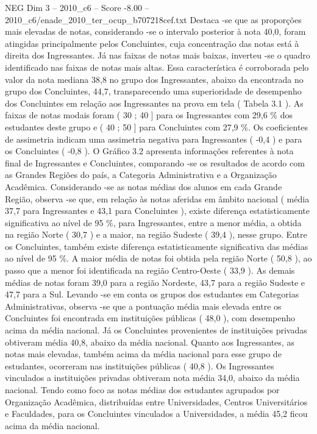 \begin{textsample}{NEG Dim 3 – 2010\_c6 – Score -8.00 – 2010\_c6/enade\_2010\_ter\_ocup\_b707218cef.txt}
Destaca -se que as proporções mais elevadas de notas, considerando -se o intervalo posterior à nota 40,0, foram atingidas principalmente pelos Concluintes, cuja concentração das notas está à direita dos Ingressantes.
Já nas faixas de notas mais baixas, inverteu -se o quadro identificado nas faixas de notas mais altas.
Essa característica é corroborada pelo valor da nota mediana 38,8 no grupo dos Ingressantes, abaixo da encontrada no grupo dos Concluintes, 44,7, transparecendo uma superioridade de desempenho dos Concluintes em relação aos Ingressantes na prova em tela ( Tabela 3.1 ).
As faixas de notas modais foram ( 30 ; 40 ] para os Ingressantes com 29,6 \% dos estudantes deste grupo e ( 40 ; 50 ] para Concluintes com 27,9 \%.
Os coeficientes de assimetria indicam uma assimetria negativa para Ingressantes ( -0,4 ) e para os Concluintes ( -0,8 ).
O Gráfico 3.2 apresenta informações referentes à nota final de Ingressantes e Concluintes, comparando -se os resultados de acordo com as Grandes Regiões do país, a Categoria Administrativa e a Organização Acadêmica.
Considerando -se as notas médias dos alunos em cada Grande Região, observa -se que, em relação às notas aferidas em âmbito nacional ( média 37,7 para Ingressantes e 43,1 para Concluintes ), existe diferença estatisticamente significativa ao nível de 95 \%, para Ingressantes, entre a menor média, a obtida na região Norte ( 30,7 ) e a maior, na região Sudeste ( 39,4 ), nesse grupo.
Entre os Concluintes, também existe diferença estatisticamente significativa das médias ao nível de 95 \%.
A maior média de notas foi obtida pela região Norte ( 50,8 ), ao passo que a menor foi identificada na região Centro-Oeste ( 33,9 ).
As demais médias de notas foram 39,0 para a região Nordeste, 43,7 para a região Sudeste e 47,7 para a Sul.
Levando -se em conta os grupos dos estudantes em Categorias Administrativas, observa -se que a pontuação média mais elevada entre os Concluintes foi encontrada em instituições públicas ( 48,0 ), com desempenho acima da média nacional.
Já os Concluintes provenientes de instituições privadas obtiveram média 40,8, abaixo da média nacional.
Quanto aos Ingressantes, as notas mais elevadas, também acima da média nacional para esse grupo de estudantes, ocorreram nas instituições públicas ( 40,8 ).
Os Ingressantes vinculados a instituições privadas obtiveram nota média 34,0, abaixo da média nacional.
Tendo como foco as notas médias dos estudantes agrupados por Organização Acadêmica, distribuídas entre Universidades, Centros Universitários e Faculdades, para os Concluintes vinculados a Universidades, a média 45,2 ficou acima da média nacional.

\end{textsample}
